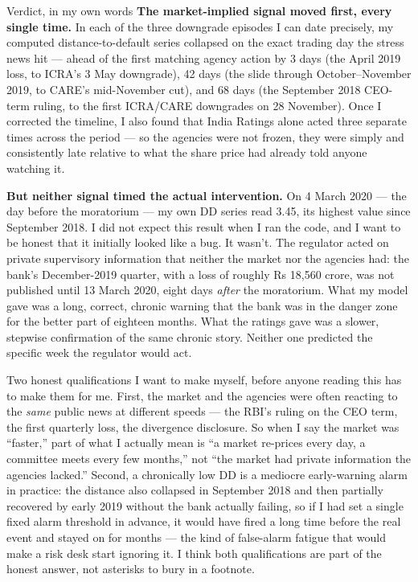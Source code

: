 \begin{keybox}{Verdict, in my own words}
\textbf{The market-implied signal moved first, every single time.} In each of the three downgrade episodes I can date precisely, my computed distance-to-default series collapsed on the exact trading day the stress news hit — ahead of the first matching agency action by 3 days (the April 2019 loss, to ICRA's 3 May downgrade), 42 days (the slide through October--November 2019, to CARE's mid-November cut), and 68 days (the September 2018 CEO-term ruling, to the first ICRA/CARE downgrades on 28 November). Once I corrected the timeline, I also found that India Ratings alone acted three separate times across the period — so the agencies were not frozen, they were simply and consistently late relative to what the share price had already told anyone watching it.

\textbf{But neither signal timed the actual intervention.} On 4 March 2020 — the day before the moratorium — my own DD series read 3.45, its highest value since September 2018. I did not expect this result when I ran the code, and I want to be honest that it initially looked like a bug. It wasn't. The regulator acted on private supervisory information that neither the market nor the agencies had: the bank's December-2019 quarter, with a loss of roughly Rs 18,560 crore, was not published until 13 March 2020, eight days \emph{after} the moratorium. What my model gave was a long, correct, chronic warning that the bank was in the danger zone for the better part of eighteen months. What the ratings gave was a slower, stepwise confirmation of the same chronic story. Neither one predicted the specific week the regulator would act.
\end{keybox}

Two honest qualifications I want to make myself, before anyone reading this has to make them for me. First, the market and the agencies were often reacting to the \emph{same} public news at different speeds — the RBI's ruling on the CEO term, the first quarterly loss, the divergence disclosure. So when I say the market was ``faster,'' part of what I actually mean is ``a market re-prices every day, a committee meets every few months,'' not ``the market had private information the agencies lacked.'' Second, a chronically low DD is a mediocre early-warning alarm in practice: the distance also collapsed in September 2018 and then partially recovered by early 2019 without the bank actually failing, so if I had set a single fixed alarm threshold in advance, it would have fired a long time before the real event and stayed on for months — the kind of false-alarm fatigue that would make a risk desk start ignoring it. I think both qualifications are part of the honest answer, not asterisks to bury in a footnote.


